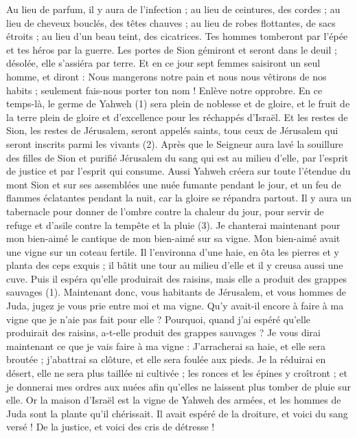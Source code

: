 \begin{multicols}{2}
Au lieu de parfum, il y aura de l’infection ; au lieu de ceintures, des cordes ; au lieu de cheveux bouclés, des têtes chauves ; au lieu de robes flottantes, de sacs étroits ; au lieu d'un beau teint, des cicatrices.
Tes hommes tomberont par l'épée et tes héros par la guerre.
Les portes de Sion gémiront et seront dans le deuil ; désolée, elle s’assiéra par terre.
\VerseOne{}Et en ce jour sept femmes saisiront un seul homme, et diront : Nous mangerons notre pain et nous nous vêtirons de nos habits ; seulement fais-nous porter ton nom ! Enlève notre opprobre.
En ce temps-là, le germe de Yahweh (1) sera plein de noblesse et de gloire, et le fruit de la terre plein de gloire et d'excellence pour les réchappés d'Israël.
Et les restes de Sion, les restes de Jérusalem, seront appelés saints, tous ceux de Jérusalem qui seront inscrits parmi les vivants (2).
Après que le Seigneur aura lavé la souillure des filles de Sion et purifié Jérusalem du sang qui est au milieu d'elle, par l’esprit de justice et par l’esprit qui consume.
Aussi Yahweh créera sur toute l'étendue du mont Sion et sur ses assemblées une nuée fumante pendant le jour, et un feu de flammes éclatantes pendant la nuit, car la gloire se répandra partout.
Il y aura un tabernacle pour donner de l'ombre contre la chaleur du jour, pour servir de refuge et d'asile contre la tempête et la pluie (3).
\VerseOne{}Je chanterai maintenant pour mon bien-aimé le cantique de mon bien-aimé sur sa vigne. Mon bien-aimé avait une vigne sur un coteau fertile.
Il l'environna d'une haie, en ôta les pierres et y planta des ceps exquis ; il bâtit une tour au milieu d'elle et il y creusa aussi une cuve. Puis il espéra qu'elle produirait des raisins, mais elle a produit des grappes sauvages (1).
Maintenant donc, vous habitants de Jérusalem, et vous hommes de Juda, jugez je vous prie entre moi et ma vigne.
Qu'y avait-il encore à faire à ma vigne que je n’aie pas fait pour elle ? Pourquoi, quand j’ai espéré qu'elle produirait des raisins, a-t-elle produit des grappes sauvages ?
Je vous dirai maintenant ce que je vais faire à ma vigne : J’arracherai sa haie, et elle sera broutée ; j’abattrai sa clôture, et elle sera foulée aux pieds.
Je la réduirai en désert, elle ne sera plus taillée ni cultivée ; les ronces et les épines y croîtront ; et je donnerai mes ordres aux nuées afin qu'elles ne laissent plus tomber de pluie sur elle.
Or la maison d'Israël est la vigne de Yahweh des armées, et les hommes de Juda sont la plante qu’il chérissait. Il avait espéré de la droiture, et voici du sang versé ! De la justice, et voici des cris de détresse !

\end{multicols}
